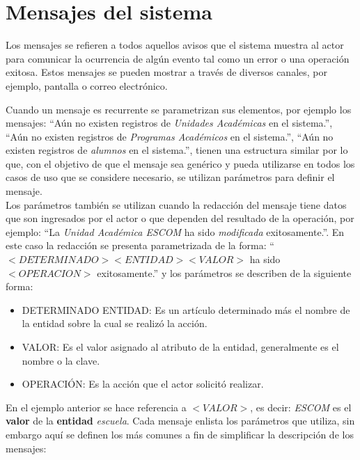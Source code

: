 \chapter{Mensajes del sistema}
\label{ch:mensajes}

Los mensajes se refieren a todos aquellos avisos que el sistema muestra al actor para comunicar la ocurrencia de algún evento tal como un error o una operación exitosa. Estos mensajes se pueden mostrar a través de diversos canales, por ejemplo, pantalla o correo electrónico.

Cuando un mensaje es recurrente se parametrizan sus elementos, por ejemplo los mensajes: ``Aún no existen registros de \textit{Unidades Académicas} en el sistema.'', ``Aún no existen registros de \textit{Programas Académicos} en el sistema.'', 
``Aún no existen registros de \textit{alumnos} en el sistema.'', tienen una estructura similar 
por lo que, con el objetivo de que el mensaje sea genérico y pueda utilizarse en todos los casos de uso que se considere necesario, se utilizan parámetros para definir el mensaje.\\

Los parámetros también se utilizan cuando la redacción del mensaje tiene datos que son ingresados por el actor o que dependen del resultado de la operación, por ejemplo: 
``La \textit{Unidad Académica ESCOM} ha sido \textit{modificada} exitosamente.''. En este caso la redacción se presenta parametrizada de la forma: ``$<DETERMINADO> <ENTIDAD> <VALOR>$ ha sido $<OPERACION>$ exitosamente.'' y los parámetros se describen de la siguiente forma:

\begin{itemize}
	\item DETERMINADO ENTIDAD: Es un artículo determinado más el nombre de la entidad sobre la cual se realizó la acción.
	\item VALOR: Es el valor asignado al atributo de la entidad, generalmente es el nombre o la clave.
	\item OPERACIÓN: Es la acción que el actor solicitó realizar.
\end{itemize}

En el ejemplo anterior se hace referencia a $<VALOR>$, es decir: \textit{ESCOM} es el \textbf{valor} de la \textbf{entidad} \textit{escuela}. Cada mensaje enlista los parámetros  que utiliza, sin embargo aquí se definen los más comunes a fin de simplificar la descripción de los mensajes:

